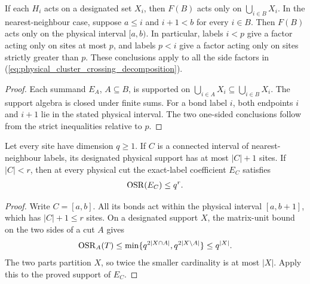 \begin{lemma}
    \label{thm:retained_cluster_physical_support}
    \leanok
    If each $H_i$ acts on a designated set $X_i$, then $F(B)$ acts
    only on $\bigcup_{i\in B}X_i$. In the nearest-neighbour case,
    suppose $a\leq i$ and $i+1<b$ for every $i\in B$. Then $F(B)$
    acts only on the physical interval $[a,b)$.
    In particular, labels $i<p$ give a factor acting only on sites
    at most $p$, and labels $p<i$ give a factor acting only on sites
    strictly greater than $p$. These conclusions apply to all the
    side factors in (\ref{eq:physical_cluster_crossing_decomposition}).
\end{lemma}
\begin{proof}\leanok
    Each summand $E_A$, $A\subseteq B$, is supported on
    $\bigcup_{i\in A}X_i\subseteq\bigcup_{i\in B}X_i$.
    The support algebra is closed under finite sums. For a bond
    label $i$, both endpoints $i$ and $i+1$ lie in the stated physical
    interval. The two one-sided conclusions follow from the strict
    inequalities relative to $p$.
\end{proof}

\begin{lemma}
    \label{thm:physical_cluster_interval_rank}
    \leanok
    Let every site have dimension $q\geq1$. If $C$ is a connected
    interval of nearest-neighbour labels, its designated physical
    support has at most $|C|+1$ sites. If $|C|<r$, then at every
    physical cut the exact-label coefficient $E_C$ satisfies
    \begin{align}
        \operatorname{OSR}(E_C)\leq q^r.\notag
    \end{align}
\end{lemma}
\begin{proof}\leanok
    Write $C=[a,b]$. All its bonds act within the physical interval
    $[a,b+1]$, which has $|C|+1\leq r$ sites. On a designated support
    $X$, the matrix-unit bound on the two sides of a cut $A$ gives
    \begin{align}
        \operatorname{OSR}_A(T)
        \leq\min\{q^{2|X\cap A|},q^{2|X\setminus A|}\}
        \leq q^{|X|}.\notag
    \end{align}
    The two parts partition $X$, so twice the smaller cardinality
    is at most $|X|$. Apply this to the proved support of $E_C$.
\end{proof}

